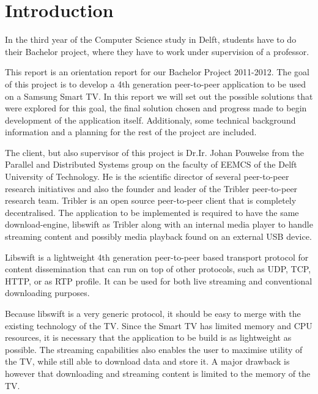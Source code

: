 \chapter*{Introduction}

In the third year of the Computer Science study in Delft, students have to do their Bachelor project, 
where they have to work under supervision of a professor.

This report is an orientation report for our Bachelor Project 2011-2012.
The goal of this project is to develop a 4th generation peer-to-peer application to be used on a Samsung Smart TV.
In this report we will set out the possible solutions that were explored for this goal,
the final solution chosen and progress made to begin development of the application itself.
Additionaly, some technical background information and a planning for the rest of the project are included.

The client, but also supervisor of this project is Dr.Ir. Johan Pouwelse from the Parallel and Distributed Systems group on the faculty of EEMCS of the Delft University of Technology.
He is the scientific director of several peer-to-peer research initiatives and also the founder and leader of the Tribler peer-to-peer research team.
Tribler is an open source peer-to-peer client that is completely decentralised.
The application to be implemented is required to have the same download-engine, libswift as Tribler 
along with an internal media player to handle streaming content and possibly media playback found on an external USB device.

Libswift is a lightweight 4th generation peer-to-peer based transport protocol for content dissemination
that can run on top of other protocols, such as UDP, TCP, HTTP, or as RTP profile.
It can be used for both live streaming and conventional downloading purposes.

Because libswift is a very generic protocol, it should be easy to merge with the existing technology of the TV.
Since the Smart TV has limited memory and CPU resources, 
it is necessary that the application to be build is as lightweight as possible.
The streaming capabilities also enables the user to maximise utility of the TV,
while still able to download data and store it.
A major drawback is however that downloading and streaming content is limited to the memory of the TV.
